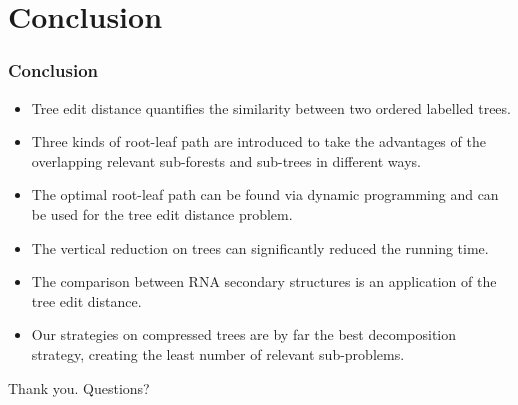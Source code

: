 \documentclass{beamer}
\begin{document}
\section{Conclusion}
\begin{frame}
\frametitle{Conclusion}
\begin{itemize}
\item Tree edit distance quantifies the similarity between two ordered labelled trees. 
\item Three kinds of root-leaf path are introduced to take the advantages of the overlapping relevant sub-forests and sub-trees in different ways.
\item The optimal root-leaf path can be found via dynamic programming and can be used for the tree edit distance problem.
\item The vertical reduction on trees can significantly reduced the running time.
\item The comparison between RNA secondary structures is an application of the tree edit distance.
\item Our strategies on compressed trees are by far the best decomposition strategy, creating the least number of relevant sub-problems.
\end{itemize}
\end{frame}
\begin{frame}
Thank you. Questions?
\end{frame}
\end{document}
